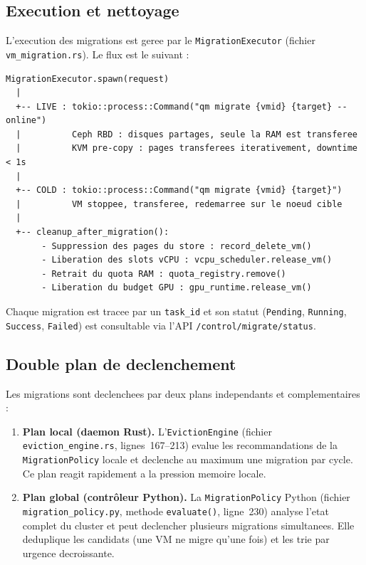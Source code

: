\subsection{Execution et nettoyage}
\label{subsec:execution-nettoyage}

L'execution des migrations est geree par le \texttt{MigrationExecutor} (fichier \texttt{vm\_migration.rs}). Le flux est le suivant :

\begin{verbatim}
MigrationExecutor.spawn(request)
  |
  +-- LIVE : tokio::process::Command("qm migrate {vmid} {target} --online")
  |          Ceph RBD : disques partages, seule la RAM est transferee
  |          KVM pre-copy : pages transferees iterativement, downtime < 1s
  |
  +-- COLD : tokio::process::Command("qm migrate {vmid} {target}")
  |          VM stoppee, transferee, redemarree sur le noeud cible
  |
  +-- cleanup_after_migration():
       - Suppression des pages du store : record_delete_vm()
       - Liberation des slots vCPU : vcpu_scheduler.release_vm()
       - Retrait du quota RAM : quota_registry.remove()
       - Liberation du budget GPU : gpu_runtime.release_vm()
\end{verbatim}

Chaque migration est tracee par un \texttt{task\_id} et son statut (\texttt{Pending}, \texttt{Running}, \texttt{Success}, \texttt{Failed}) est consultable via l'API \texttt{/control/migrate/status}.

\subsection{Double plan de declenchement}
\label{subsec:double-declenchement}

Les migrations sont declenchees par deux plans independants et complementaires :

\begin{enumerate}
    \item \textbf{Plan local (daemon Rust).} L'\texttt{EvictionEngine} (fichier \texttt{eviction\_engine.rs}, lignes~167--213) evalue les recommandations de la \texttt{MigrationPolicy} locale et declenche au maximum une migration par cycle. Ce plan reagit rapidement a la pression memoire locale.

    \item \textbf{Plan global (contrôleur Python).} La \texttt{MigrationPolicy} Python (fichier \texttt{migration\_policy.py}, methode \texttt{evaluate()}, ligne~230) analyse l'etat complet du cluster et peut declencher plusieurs migrations simultanees. Elle deduplique les candidats (une VM ne migre qu'une fois) et les trie par urgence decroissante.
\end{enumerate}

